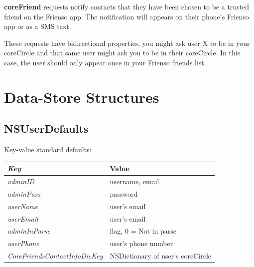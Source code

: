   \noindent \textbf{coreFriend} requests notify contacts that they have been chosen to be 
  a trusted friend on the Frienso app.  The notification will appears on their phone's 
  Frienso app or as a SMS text.  
  
  These requests have bidirectional properties, you might ask user X to be in your 
  coreCircle and that same user might ask you to be in their coreCircle.  In this case,
  the user should only appear once in your Frienso friends list.
  
%  
  
\section{Data-Store Structures}
\subsection{NSUserDefaults}
Key-value standard defaults:
	\begin{table}[ht!]%
	\begin{tabularx}{\linewidth}{ l X }
	\emph{Key} & Value \\\hline
	\emph{adminID} & username, email \\
	\emph{adminPass} & password \\
	\emph{userName} & user's email \\
	\emph{userEmail} & user's email \\
	\emph{adminInParse} & flag, 0 = Not in parse\\
	\emph{userPhone} & user's phone number \\
	\emph{CoreFriendsContactInfoDicKey} & NSDictionary of user's coreCircle\\
	\end{tabularx}
	\end{table}%
	
	
